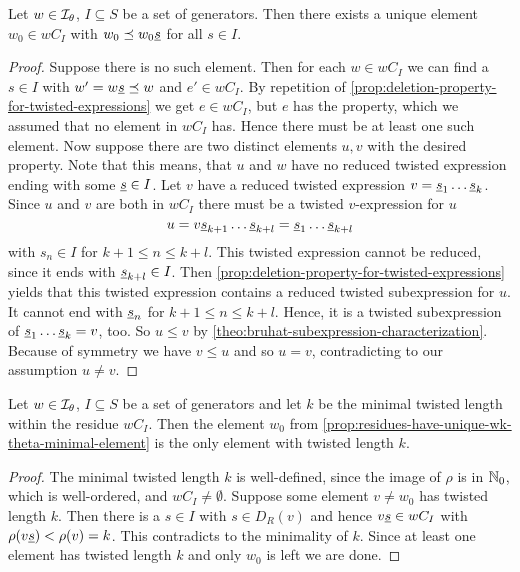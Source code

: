 \begin{prop}
	Let $w \in \mathcal{I}_{\theta}$, $I \subseteq S$ be a set of generators. Then there exists a unique element $w_0 \in wC_I$ with $w_0 \preceq w_0 \underline{s}$ for all $s \in I$.

	\begin{proof}
		Suppose there is no such element. Then for each $w \in wC_I$ we can find a $s \in I$ with $w' = w \underline{s} \preceq w$ and $e' \in wC_I$. By repetition of \ref{prop:deletion-property-for-twisted-expressions} we get $e \in wC_I$, but $e$ has the property, which we assumed that no element in $wC_I$ has. Hence there must be at least one such element. Now suppose there are two distinct elements $u,v$ with the desired property. Note that this means, that $u$ and $w$ have no reduced twisted expression ending with some $\underline{s} \in I$. Let $v$ have a reduced twisted expression $v = \underline{s}_1 \ldots \underline{s}_k$. Since $u$ and $v$ are both in $wC_I$ there must be a twisted $v$-expression for $u$
		$$ u = v \underline{s}_{k+1} \ldots \underline{s}_{k+l} = \underline{s}_1 \ldots \underline{s}_{k+l} $$
		with $s_n \in I$ for $k+1 \leq n \leq k+l$. This twisted expression cannot be reduced, since it ends with $\underline{s}_{k+l} \in I$. Then \ref{prop:deletion-property-for-twisted-expressions} yields that this twisted expression contains a reduced twisted subexpression for $u$. It cannot end with $\underline{s}_n$ for $k+1 \leq n \leq k+l$. Hence, it is a twisted subexpression of $\underline{s}_1 \ldots \underline{s}_k = v$, too. So $u \leq v$ by \ref{theo:bruhat-subexpression-characterization}. Because of symmetry we have $v \leq u$ and so $u = v$, contradicting to our assumption $u \neq v$.
	\end{proof}
\end{prop}

\begin{coro}
	Let $w \in \mathcal{I}_{\theta}$, $I \subseteq S$ be a set of generators and let $k$ be the minimal twisted length within the residue $wC_I$. Then the element $w_0$ from \ref{prop:residues-have-unique-wk-theta-minimal-element} is the only element with twisted length $k$.

	\begin{proof}
		The minimal twisted length $k$ is well-defined, since the image of $\rho$ is in $\mathbb{N}_0$, which is well-ordered, and $wC_I \neq \emptyset$. Suppose some element $v \neq w_0$ has twisted length $k$. Then there is a $s \in I$ with $s \in D_R(v)$ and hence $v \underline{s} \in wC_I$ with $\rho(v \underline{s}) < \rho(v) = k$. This contradicts to the minimality of $k$. Since at least one element has twisted length $k$ and only $w_0$ is left we are done.
	\end{proof}
\end{coro}

